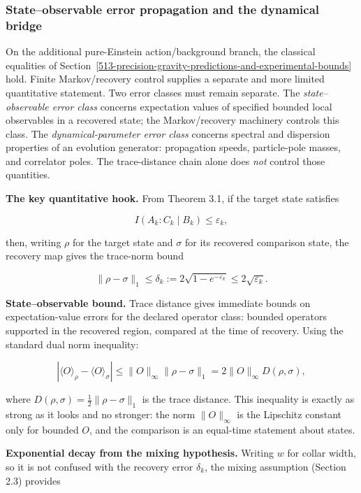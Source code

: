 \subsubsection{State--observable error propagation and the dynamical bridge}\label{514-theory-side-error-propagation-from-markov-bounds}

On the additional pure-Einstein action/background branch, the classical equalities of Section~\ref{513-precision-gravity-predictions-and-experimental-bounds} hold. Finite Markov/recovery control supplies a separate and more limited quantitative statement. Two error classes must remain separate. The \emph{state--observable error class} concerns expectation values of specified bounded local observables in a recovered state; the Markov/recovery machinery controls this class. The \emph{dynamical-parameter error class} concerns spectral and dispersion properties of an evolution generator: propagation speeds, particle-pole masses, and correlator poles. The trace-distance chain alone does \emph{not} control those quantities.

\textbf{The key quantitative hook.} From Theorem 3.1, if the target state satisfies

\[
I(A_k : C_k \mid B_k) \le \varepsilon_k,
\]

then, writing \(\rho\) for the target state and \(\sigma\) for its recovered comparison state, the recovery map gives the trace-norm bound

\[
\|\rho-\sigma\|_1\le \delta_k
:=2\sqrt{1-e^{-\varepsilon_k}}
\le2\sqrt{\varepsilon_k}.
\]

\textbf{State--observable bound.} Trace distance gives immediate bounds on expectation-value errors for the declared operator class: bounded operators supported in the recovered region, compared at the time of recovery. Using the standard dual norm inequality:

\[
|\langle O \rangle_\rho - \langle O \rangle_\sigma|
\le \|O\|_\infty \|\rho - \sigma\|_1 = 2 \|O\|_\infty D(\rho, \sigma),
\]

where \(D(\rho, \sigma) = \frac{1}{2}\|\rho - \sigma\|_1\) is the trace distance. This inequality is exactly as strong as it looks and no stronger: the norm \(\|O\|_\infty\) is the Lipschitz constant only for bounded \(O\), and the comparison is an equal-time statement about states.

\textbf{Exponential decay from the mixing hypothesis.} Writing \(w\) for collar width, so it is not confused with the recovery error \(\delta_k\), the mixing assumption (Section 2.3) provides

